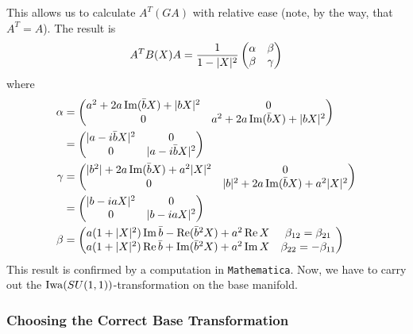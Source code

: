 \documentclass[parskip=half]{scrartcl}
\begin{document}
This allows us to calculate $A^T(GA)$ with relative ease (note, by the way, that $A^T=A$). The result is
\begin{equation*}
	A^TB(X)A=\frac{1}{1-\lvert X \rvert^2}
	\begin{pmatrix}
		\alpha & \beta \\ \beta & \gamma
	\end{pmatrix}
\end{equation*}
where
\begin{align*}
	\alpha &=
	\begin{pmatrix}
		a^2+2a\operatorname{Im} (\bar bX) + \lvert bX \rvert^2 & 0 \\
		0 & a^2+2a\operatorname{Im} (\bar bX) + \lvert bX \rvert^2
	\end{pmatrix} \\
	 &=
	 \begin{pmatrix}
	 	\lvert a-i\bar b X \rvert^2 & 0 \\ 0 & \lvert a-i\bar b X \rvert^2
	 \end{pmatrix}\\
	 \gamma &= 
	\begin{pmatrix}
		\lvert b^2 \rvert+2a\operatorname{Im}(\bar bX) + a^2\lvert X \rvert^2 & 0 \\
		0 & \lvert b \rvert^2+ 2a\operatorname{Im}(\bar bX) + a^2\lvert X \rvert^2
	\end{pmatrix}\\
	&= 
	\begin{pmatrix}
		\lvert b-ia X \rvert^2 & 0 \\ 0 & \lvert b-ia X \rvert^2
	\end{pmatrix}\\
	\beta &=
	\begin{pmatrix}
		 a(1+\lvert X \rvert^2)\operatorname{Im} \bar b -\operatorname{Re}(\bar b^2X)+a^2 \operatorname{Re} X 
		 & \beta_{12}=\beta_{21} \\
		 a(1+\lvert X \rvert^2)\operatorname{Re} \bar b +\operatorname{Im}(\bar b^2X)+a^2\operatorname{Im} X
		 & \beta_{22}=-\beta_{11}
	\end{pmatrix}
\end{align*}
This result is confirmed by a computation in \texttt{Mathematica}. Now, we have to carry out the $\operatorname{Iwa}(SU(1,1))$-transformation on the base manifold.

\subsubsection{Choosing the Correct Base Transformation} 
\end{document}
